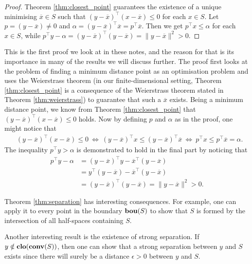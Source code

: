 %
\begin{proof}
	Theorem \ref{thm:closest_point} guarantees the existence of a unique minimising $\overline{x} \in S$ such that $(y-\overline{x})^\top(x - \overline{x}) \leq 0$ for each $x \in S$. Let $p = (y - \overline{x}) \neq 0$ and $\alpha = (y - \overline{x})^\top\overline{x} = p^\top\overline{x}$. Then we get $p^\top x \leq \alpha$ for each $x \in S$, while $p^\top y - \alpha = (y - \overline{x})^\top(y - \overline{x}) = \|y - \overline{x}\|^2 > 0$.
\end{proof}

This is the first proof we look at in these notes, and the reason for that is its importance in many of the results we will discuss further. The proof first looks at the problem of finding a minimum distance point as an optimisation problem and uses the Weierstrass theorem (in our finite-dimensional setting, Theorem \ref{thm:closest_point} is a consequence of the Weierstrass theorem stated in Theorem \ref{thm:weierstrass}) to guarantee that such a $\overline{x}$ exists. Being a minimum distance point, we know from Theorem \ref{thm:closest_point} that $(y-\overline{x})^\top(x - \overline{x}) \leq 0$ holds. Now by defining $p$ and $\alpha$ as in the proof, one might notice that
%
\begin{align*}
	& (y-\overline{x})^\top(x - \overline{x}) \leq 0 \ \Leftrightarrow \ 
	(y-\overline{x})^\top x \leq (y - \overline{x})^\top\overline{x} \ \Leftrightarrow \ 
	p^\top x \leq p^\top\overline{x} = \alpha. 
\end{align*}
%
The inequality $p^\top y > \alpha$ is demonstrated to hold in the final part by noticing that 
%
\begin{align*}
	p^\top y - \alpha &= 
	(y - \overline{x})^\top y - \overline{x}^\top(y - \overline{x}) \\ &= 
	y^\top(y - \overline{x}) - \overline{x}^\top(y - \overline{x}) \\ & = (y - \overline{x})^\top (y - \overline{x}) = \| y - \overline{x} \|^2 > 0.
\end{align*}

Theorem \ref{thm:separation} has interesting consequences. For example, one can apply it to every point in the boundary $\mathop{\bf bou}(S)$ to show that $S$ is formed by the intersection of all half-spaces containing $S$. 

Another interesting result is the existence of strong separation. If $y \notin \mathop{\bf clo}(\mathop{\bf conv}(S))$, then one can show that a strong separation between $y$ and $S$ exists since there will surely be a distance $\epsilon>0$ between $y$ and $S$. 



